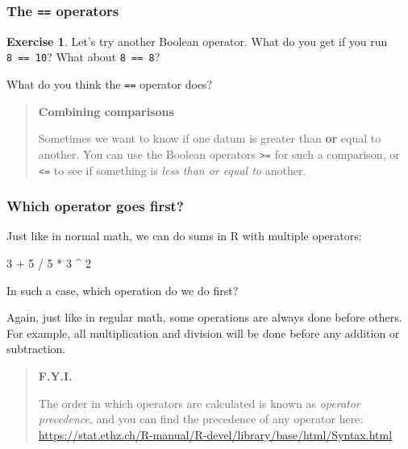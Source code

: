 \documentclass[
]{article}
\newenvironment{Shaded}{\begin{snugshade}}{\end{snugshade}}
\newcommand{\DecValTok}[1]{\textcolor[rgb]{0.00,0.00,0.81}{#1}}
\newcommand{\SpecialCharTok}[1]{\textcolor[rgb]{0.00,0.00,0.00}{#1}}
\theoremstyle{definition}
\theoremstyle{definition}
\theoremstyle{definition}
\newtheorem{exercise}{Exercise}[section]
\theoremstyle{definition}
\theoremstyle{remark}
\begin{document}
\hypertarget{the-operators}{%
\subsubsection{\texorpdfstring{The \texttt{==} operators}{The == operators}}\label{the-operators}}

\begin{exercise}
Let's try another Boolean operator. What do you get if you run \texttt{8\ ==\ 10}?
What about \texttt{8\ ==\ 8}?

What do you think the \texttt{==} operator does?
\end{exercise}

\begin{quote}
\textbf{Combining comparisons}

Sometimes we want to know if one datum is greater than \textbf{or} equal
to another. You can use the Boolean operators \texttt{\textgreater{}=} for such a comparison, or
\texttt{\textless{}=} to see if something is \emph{less than or equal to} another.
\end{quote}

\hypertarget{which-operator-goes-first}{%
\subsubsection{Which operator goes first?}\label{which-operator-goes-first}}

Just like in normal math, we can do sums in R with multiple operators:

\begin{Shaded}
\begin{Highlighting}[]
\DecValTok{3} \SpecialCharTok{+} \DecValTok{5} \SpecialCharTok{/} \DecValTok{5} \SpecialCharTok{*} \DecValTok{3} \SpecialCharTok{\^{}} \DecValTok{2}
\end{Highlighting}
\end{Shaded}

In such a case, which operation do we do first?

Again, just like in regular math, some operations are always done before others. For example, all multiplication and division will be done before any addition or subtraction.

\begin{quote}
\textbf{F.Y.I.}

The order in which operators are calculated is known as \emph{operator precedence}, and you can find the precedence of any operator here: \url{https://stat.ethz.ch/R-manual/R-devel/library/base/html/Syntax.html}
\end{quote}
\end{document}
